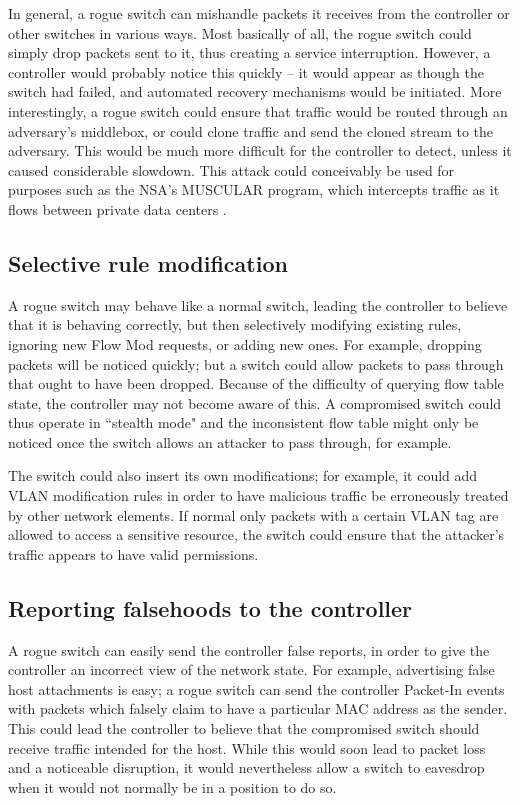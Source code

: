 In general, a rogue switch can mishandle packets it receives from the controller or other switches in various ways. Most basically of all, the rogue switch could simply drop packets sent to it, thus creating a service interruption. However, a controller would probably notice this quickly -- it would appear as though the switch had failed, and automated recovery mechanisms would be initiated. More interestingly, a rogue switch could ensure that traffic would be routed through an adversary's middlebox, or could clone traffic and send the cloned stream to the adversary. This would be much more difficult for the controller to detect, unless it caused considerable slowdown. This attack could conceivably be used for purposes such as the NSA's MUSCULAR program, which intercepts traffic as it flows between private data centers \cite{muscular}. 


\subsection{Selective rule modification}
A rogue switch may behave like a normal switch, leading the controller to believe that it is behaving correctly, but then selectively modifying existing rules, ignoring new Flow Mod requests, or adding new ones. For example, dropping packets will be noticed quickly; but a switch could allow packets to pass through that ought to have been dropped. Because of the difficulty of querying flow table state, the controller may not become aware of this. A compromised switch could thus operate in ``stealth mode" and the inconsistent flow table might only be noticed once the switch allows an attacker to pass through, for example.

The switch could also insert its own modifications; for example, it could add VLAN modification rules in order to have malicious traffic be erroneously treated by other network elements. If normal only packets with a certain VLAN tag are allowed to access a sensitive resource, the switch could ensure that the attacker's traffic appears to have valid permissions.

\subsection{Reporting falsehoods to the controller}

A rogue switch can easily send the controller false reports, in order to give the controller an incorrect view of the network state. For example, advertising false host attachments is easy; a rogue switch can send the controller Packet-In events with packets which falsely claim to have a particular MAC address as the sender. This could lead the controller to believe that the compromised switch should receive traffic intended for the host. While this would soon lead to packet loss and a noticeable disruption, it would nevertheless allow a switch to eavesdrop when it would not normally be in a position to do so.

